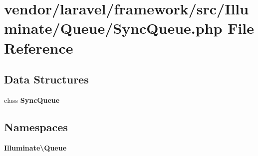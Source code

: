 \section{vendor/laravel/framework/src/\+Illuminate/\+Queue/\+Sync\+Queue.php File Reference}
\label{_sync_queue_8php}
\subsection*{Data Structures}
\begin{DoxyCompactItemize}
\item 
class {\bf Sync\+Queue}
\end{DoxyCompactItemize}
\subsection*{Namespaces}
\begin{DoxyCompactItemize}
\item 
 {\bf Illuminate\textbackslash{}\+Queue}
\end{DoxyCompactItemize}
